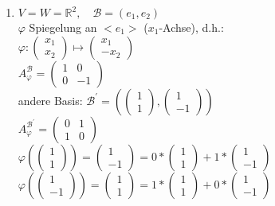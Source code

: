\documentclass[a4paper,11pt]{article}
\begin{document}
\begin{enumerate}[label=\alph*)]
	\item $V=W=\mathbb{R}^2,\quad\mathcal{B}=(e_1,e_2)$ \\
	$\varphi$ Spiegelung an $<e_1>$ ($x_1$-Achse), d.h.: \\
	$\varphi\colon\begin{pmatrix}x_1\\x_2\end{pmatrix}\mapsto\begin{pmatrix}x_1\\-x_2\end{pmatrix}$ \\
	$A^\mathcal{B}_\varphi=\begin{pmatrix}1&0\\0&-1\end{pmatrix}$ \\
	andere Basis: $\mathcal{B}^\prime=\left(\begin{pmatrix}1\\1\end{pmatrix},\begin{pmatrix}1\\-1\end{pmatrix}\right)$ \\
	$A^{\mathcal{B}^\prime}_\varphi=\begin{pmatrix}0&1\\1&0\end{pmatrix}$ \\
	$\varphi\left(\begin{pmatrix}1\\1\end{pmatrix}\right)=\begin{pmatrix}1\\-1\end{pmatrix}=0*\begin{pmatrix}1\\1\end{pmatrix}+1*\begin{pmatrix}1\\-1\end{pmatrix}$ \\
	$\varphi\left(\begin{pmatrix}1\\-1\end{pmatrix}\right)=\begin{pmatrix}1\\1\end{pmatrix}=1*\begin{pmatrix}1\\1\end{pmatrix}+0*\begin{pmatrix}1\\-1\end{pmatrix}$ \\ \\

\end{enumerate}
\end{document}
